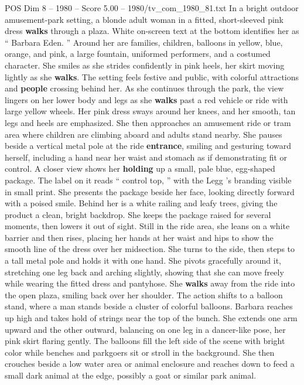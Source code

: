 \begin{textsample}{POS Dim 8 – 1980 – Score 5.00 – 1980/tv\_com\_1980\_81.txt}  \label{ex:f8_pos_049}
In a bright outdoor amusement-park setting, a blonde adult woman in a fitted, short-sleeved pink dress \textbf{walks} through a plaza.
White on-screen text at the bottom identifies her as “ Barbara Eden. ” Around her are families, children, balloons in yellow, blue, orange, and pink, a large fountain, uniformed performers, and a costumed character.
She smiles as she strides confidently in pink heels, her skirt moving lightly as she \textbf{walks}.
The setting feels festive and public, with colorful attractions and \textbf{people} crossing behind her.
As she continues through the park, the view lingers on her lower body and legs as she \textbf{walks} past a red vehicle or ride with large yellow wheels.
Her pink dress sways around her knees, and her smooth, tan legs and heels are emphasized.
She then approaches an amusement ride or tram area where children are climbing aboard and adults stand nearby.
She pauses beside a vertical metal pole at the ride \textbf{entrance}, smiling and gesturing toward herself, including a hand near her waist and stomach as if demonstrating fit or control.
A closer view shows her \textbf{holding} up a small, pale blue, egg-shaped package.
The label on it reads “ control top, ” with the Legg ’s branding visible in small print.
She presents the package beside her face, looking directly forward with a poised smile.
Behind her is a white railing and leafy trees, giving the product a clean, bright backdrop.
She keeps the package raised for several moments, then lowers it out of sight.
Still in the ride area, she leans on a white barrier and then rises, placing her hands at her waist and hips to show the smooth line of the dress over her midsection.
She turns to the side, then steps to a tall metal pole and holds it with one hand.
She pivots gracefully around it, stretching one leg back and arching slightly, showing that she can move freely while wearing the fitted dress and pantyhose.
She \textbf{walks} away from the ride into the open plaza, smiling back over her shoulder.
The action shifts to a balloon stand, where a man stands beside a cluster of colorful balloons.
Barbara reaches up high and takes hold of strings near the top of the bunch.
She extends one arm upward and the other outward, balancing on one leg in a dancer-like pose, her pink skirt flaring gently.
The balloons fill the left side of the scene with bright color while benches and parkgoers sit or stroll in the background.
She then crouches beside a low water area or animal enclosure and reaches down to feed a small dark animal at the edge, possibly a goat or similar park animal.

\end{textsample}
